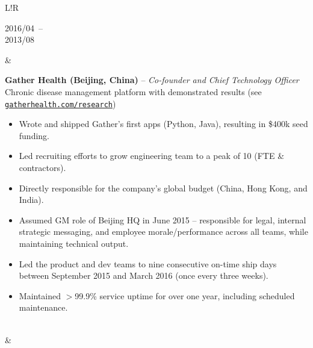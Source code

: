\documentclass[10pt]{article}
\newcommand\VRule{\color{lightgray}\vrule width 0.5pt}
\def\spaceBetweenExperienceEntries{\vspace{8pt}&\vspace{8pt}\\}
\def\spaceBeforeExperienceBullets{\vspace{-10pt}}
\begin{document}
\begin{CJK}{UTF8}{gbsn}
\begin{tabular}{L!{\VRule}R}
    \parbox[t]{1.0\linewidth}{
        {\scriptsize 2016/04}~--\\
        {\scriptsize 2013/08}
    }&
    \parbox[t]{1.0\linewidth}{
        {\bf Gather Health (Beijing, China)} -- \textit{Co-founder and Chief Technology Officer}\\
        Chronic disease management platform with demonstrated results (see \texttt{\small\href{https://gatherhealth.com/research}{gatherhealth.com/research}})\\
        \spaceBeforeExperienceBullets
        \begin{itemize}[leftmargin=16pt]
            \item Wrote and shipped Gather's first apps (Python, Java), resulting in \$400k seed funding.
            \item Led recruiting efforts to grow engineering team to a peak of 10 (FTE \& contractors).
            \item Directly responsible for the company's global budget (China, Hong Kong, and India).
            \item Assumed GM role of Beijing HQ in June 2015 -- responsible for legal, internal strategic messaging, and employee morale/performance across all teams, while maintaining technical output.
            \item Led the product and dev teams to nine consecutive on-time ship days between September 2015 and March 2016 (once every three weeks).
            \item Maintained $>$99.9\% service uptime for over one year, including scheduled maintenance.
        \end{itemize}
    }\\

    \spaceBetweenExperienceEntries


\end{tabular}
\end{CJK}
\end{document}
